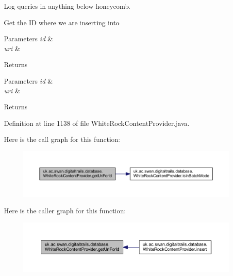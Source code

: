 Log queries in anything below honeycomb. 

Get the I\+D where we are inserting into 
\begin{DoxyParams}{Parameters}
{\em id} & \\
\hline
{\em uri} & \\
\hline
\end{DoxyParams}
\begin{DoxyReturn}{Returns}

\end{DoxyReturn}

\begin{DoxyParams}{Parameters}
{\em id} & \\
\hline
{\em uri} & \\
\hline
\end{DoxyParams}
\begin{DoxyReturn}{Returns}

\end{DoxyReturn}


Definition at line 1138 of file White\+Rock\+Content\+Provider.\+java.



Here is the call graph for this function\+:
\nopagebreak
\begin{figure}[H]
\begin{center}
\leavevmode
\includegraphics[width=350pt]{classuk_1_1ac_1_1swan_1_1digitaltrails_1_1database_1_1_white_rock_content_provider_abac163f5ac9b99878de796e5ccba7bbf_cgraph}
\end{center}
\end{figure}




Here is the caller graph for this function\+:
\nopagebreak
\begin{figure}[H]
\begin{center}
\leavevmode
\includegraphics[width=350pt]{classuk_1_1ac_1_1swan_1_1digitaltrails_1_1database_1_1_white_rock_content_provider_abac163f5ac9b99878de796e5ccba7bbf_icgraph}
\end{center}
\end{figure}


